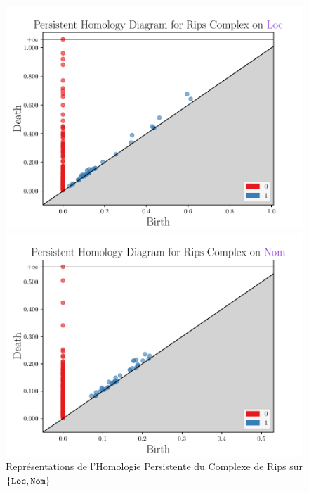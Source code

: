 \documentclass{cours}
\begin{document}
    \begin{figure}[H]
        \begin{minipage}{.5\textwidth}
            \begin{center}
                \includegraphics[width=\linewidth]{Figures/Visualisations/rc_Loc.pdf}
            \end{center}
        \end{minipage}
        \begin{minipage}{.5\textwidth}
            \begin{center}
                \includegraphics[width=\linewidth]{Figures/Visualisations/rc_Nom.pdf}
            \end{center}
        \end{minipage}
        \caption{Représentations de l'Homologie Persistente du Complexe de Rips sur $\{\tt Loc,Nom\}$}
    \end{figure}
\end{document}
